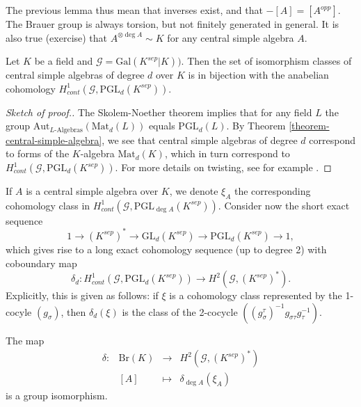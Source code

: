 \noindent
The previous lemma thus mean that inverses exist, and that $-[A] = [A^{opp}]$. 
The Brauer group is always torsion, but not finitely generated in general. It 
is also true (exercise) that $A^{\otimes \deg A} \sim K$ for any central simple 
algebra $A$.

\begin{lemma}
\label{lemma-central-simple-algebra-pgln}
Let $K$ be a field and $\mathcal{G} = \text{Gal} (K^{sep}|K))$. Then the set of 
isomorphism classes of central simple algebras of degree $d$ over $K$ is in 
bijection with the anabelian cohomology $H_{cont}^1 (\mathcal{G}, 
\text{PGL}_d(K^{sep}))$.
\end{lemma}

\begin{proof}[Sketch of proof.]
The Skolem-Noether theorem implies that for any field $L$
the group
$\text{Aut}_{L\text{-Algebras}}(\text{Mat}_d(L))$
equals $\text{PGL}_d(L)$. By 
Theorem \ref{theorem-central-simple-algebra}, we see that
central simple algebras of degree $d$ correspond 
to forms of the $K$-algebra $\text{Mat}_d(K)$, which in turn correspond to 
$H_{cont}^1 (\mathcal{G}, \text{PGL}_d(K^{sep}))$. For more details on
twisting, see for example
\cite{SilvermanEllipticCurves}.
\end{proof}

\noindent
If $A$ is a central simple algebra over $K$, we denote $\xi_A$ the 
corresponding cohomology class in $H_{cont}^1 (\mathcal{G}, \text{PGL}_{\deg 
A}(K^{sep}))$. Consider now the short exact sequence 
$$
1 \to (K^{sep})^* \to \text{GL}_d(K^{sep}) \to \text{PGL}_d(K^{sep}) \to 1,
$$
 which gives rise to a long exact cohomology sequence (up to degree 2) with 
coboundary map 
$$
 \delta_d : H_{cont} ^1(\mathcal{G}, \text{PGL}_d(K^{sep})) \to H^2 
(\mathcal{G}, (K^{sep})^*).
$$ 
Explicitly, this is given as follows: if $\xi$ is a cohomology class 
represented by the 1-cocyle $(g_\sigma)$, then $\delta_d(\xi)$ is the class of 
the 2-cocycle $((g_\sigma^\tau)^{-1} g_{\sigma \tau} g_\tau^{-1})$. 

\begin{theorem}
\label{theorem-brauer-delta}
The map
$$
\begin{matrix}
\delta : & \text{Br}(K) &  \longrightarrow & H^2(\mathcal{G}, (K^{sep})^*) \\
& [A] & \longmapsto & \delta_{\deg A} (\xi_A)
\end{matrix}
$$
is a group isomorphism.
\end{theorem}

